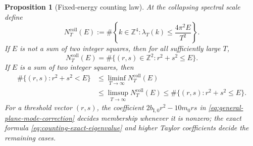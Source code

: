 \documentclass[11pt]{article}
\numberwithin{equation}{section}
\newtheorem{proposition}[theorem]{Proposition}
\theoremstyle{definition}
\theoremstyle{remark}
\newcommand{\Z}{\mathbb Z}
\begin{document}
\begin{proposition}[Fixed-energy counting law]
At the collapsing spectral scale define
\begin{equation}\label{eq:collapsing-count-definition}
 N_T^{\mathrm{coll}}(E):=
 \#\left\{k\in\Z^4:
 \lambda_T(k)\le\frac{4\pi^2E}{T^2}\right\}.
\end{equation}
If $E$ is not a sum of two integer squares, then for all sufficiently large
$T$,
\begin{equation}\label{eq:collapsing-count}
 N_T^{\mathrm{coll}}(E)
 =\#\{(r,s)\in\Z^2:r^2+s^2\le E\}.
\end{equation}
If $E$ is a sum of two integer squares, then
\begin{equation}\label{eq:threshold-count}
 \begin{split}
 \#\{(r,s):r^2+s^2<E\}
 &\le\liminf_{T\to\infty}N_T^{\mathrm{coll}}(E)\\
 &\le\limsup_{T\to\infty}N_T^{\mathrm{coll}}(E)
 \le\#\{(r,s):r^2+s^2\le E\}.
 \end{split}
\end{equation}
For a threshold vector $(r,s)$, the coefficient
$2b_{\mathrm I,0}r^2-10m_0rs$ in \eqref{eq:general-plane-mode-correction} decides
membership whenever it is nonzero; the exact formula
\eqref{eq:counting-exact-eigenvalue} and higher Taylor coefficients decide
the remaining cases.
\end{proposition}
\end{document}
